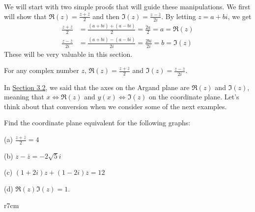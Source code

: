 \documentclass[../book.tex]{subfiles}
\begin{document}
We will start with two simple proofs that will guide these manipulations.  We first will show that $\displaystyle \Re(z)=\frac{z+\overline{z}}{2}$ and then $\displaystyle \Im(z)=\frac{z-\overline{z}}{2i}$.  By letting $z=a+bi$, we get \begin{align*}
    \frac{z+\overline{z}}{2}&=\frac{\left(a+bi\right)+\left(a-bi\right)}{2}=\frac{2a}{2}=a=\Re(z) \\
    \frac{z-\overline{z}}{2i}&=\frac{\left(a+bi\right)-\left(a-bi\right)}{2i}=\frac{2bi}{2i}=b=\Im(z)
\end{align*}
These will be very valuable in this section.  \begin{note}
For any complex number $z$, $\displaystyle \Re(z)=\frac{z+\overline{z}}{2}$ and $\displaystyle \Im(z)=\frac{z-\overline{z}}{2i}$.
\end{note}
\noindent In \hyperlink{section.3.2}{Section 3.2}, we said that the axes on the Argand plane are $\Re(z)$ and $\Im(z)$, meaning that $x \Longleftrightarrow \Re(z)$ and $y(x) \Longleftrightarrow \Im(z)$ on the coordinate plane.  Let's think about that conversion when we consider some of the next examples.
\begin{example}
Find the coordinate plane equivalent for the following graphs:

(a) $\displaystyle \frac{z+\overline{z}}{2}=4$

(b) $z-\overline{z}=-2\sqrt{5}i$

(c) $\left(1+2i\right)z+\left(1-2i\right)\overline{z}=12$

(d) $\Re(z)\Im(z)=1$.

\end{example}

\begin{wrapfigure}{r}{7cm}
    \centering
{}
\end{wrapfigure}
\end{document}
